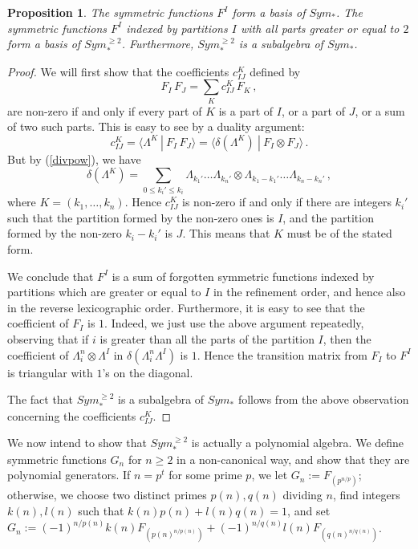 \documentclass[a4paper,12pt]{amsart}
\newtheorem{prop}[equation]{Proposition}
\theoremstyle{definition}
\numberwithin{equation}{section}
\newcommand{\br}[1]{\langle#1\rangle}
\newcommand{\dual}[2]{\br{#1 \:|\: #2}}
\begin{document}
\begin{prop}\label{bases}
The symmetric functions $F^I$ form a basis of $Sym_*$. The symmetric functions $F^I$ indexed by partitions $I$ with all parts greater or equal to $2$ form a basis of $Sym_*^{\ge 2}$. Furthermore, $Sym_*^{\ge 2}$ is a subalgebra of $Sym_*$.
\end{prop}
\begin{proof}
We will first show that the coefficients $c_{IJ}^K$ defined by
\[F_I\,F_J=\sum_K c_{IJ}^K\,F_K\,,\]
are non-zero if and only if every part of $K$ is a part of $I$, or a part of $J$, or a sum of two such parts. This is easy to see by a duality argument:
\[ c_{IJ}^K=\dual{\varLambda^K}{F_I\,F_J}=\dual{\delta(\varLambda^K)}{F_I\otimes F_J}\,.\]
But by (\ref{divpow}), we have
\[\delta(\varLambda^K)=\sum_{0\le k_i'\le k_i} \varLambda_{k_1'}\ldots\varLambda_{k_n'}\otimes \varLambda_{k_1-k_1'}\ldots\varLambda_{k_n-k_n'}\,,\]
where $K=(k_1,\ldots,k_n)$. Hence $c_{IJ}^K$ is non-zero if and only if there are integers $k_i'$ such that the partition formed by the non-zero ones is $I$, and the partition formed by the non-zero $k_i-k_i'$ is $J$. This means that $K$ must be of the stated form. 

We conclude that $F^I$ is a sum of forgotten symmetric functions indexed by partitions which are greater or equal to $I$ in the refinement order, and hence also in the reverse lexicographic order. Furthermore, it is easy to see that the coefficient of $F_I$ is $1$. Indeed, we just use the above argument repeatedly, observing that if $i$ is greater than all the parts of the partition $I$, then the coefficient of $\varLambda_i^n\otimes\varLambda^I$ in $\delta(\varLambda_i^n\varLambda^I)$ is $1$. Hence the transition matrix from $F_I$ to $F^I$ is triangular with $1$'s on the diagonal.

The fact that $Sym_*^{\ge 2}$ is a subalgebra of $Sym_*$ follows from the above observation concerning the coefficients $c_{IJ}^K$. 

\end{proof}

We now intend to show that $Sym_*^{\ge 2}$ is actually a polynomial algebra. We define symmetric functions $G_n$ for $n\ge 2$ in a non-canonical way, and show that they are polynomial generators. If $n=p^t$ for some prime $p$, we let $G_n:=F_{(p^{n/p})}$; otherwise, we choose two distinct primes $p(n),q(n)$ dividing $n$, find integers $k(n),l(n)$ such that $k(n)p(n)+l(n)q(n)=1$, and set $G_n:=(-1)^{n/p(n)}k(n) F_{(p(n)^{n/p(n)})}+(-1)^{n/q(n)}l(n) F_{(q(n)^{n/q(n)})}$. 
\end{document}
